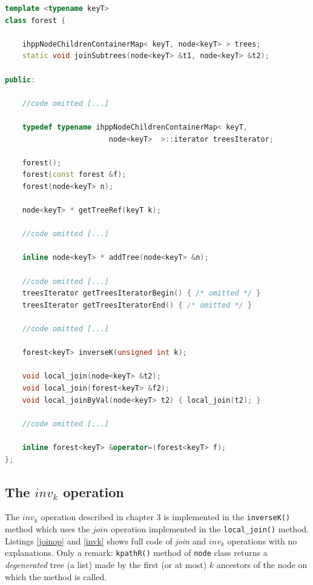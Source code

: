 \documentclass[a4paper,10pt]{report}
\begin{document}
\begin{lstlisting}[language=C++, 
	caption={partial definition of \texttt{forest<keyT>} class}, 
	label=forestClass, frame=leftline]
template <typename keyT>
class forest {

	ihppNodeChildrenContainerMap< keyT, node<keyT> > trees;
	static void joinSubtrees(node<keyT> &t1, node<keyT> &t2);

public:

	//code omitted [...]
	
	typedef typename ihppNodeChildrenContainerMap< keyT, 
						node<keyT>  >::iterator treesIterator;

	forest();
	forest(const forest &f);
	forest(node<keyT> n);

	node<keyT> * getTreeRef(keyT k);
	
	//code omitted [...]

	inline node<keyT> * addTree(node<keyT> &n);
	
	//code omitted [...]
	treesIterator getTreesIteratorBegin() { /* omitted */ }
	treesIterator getTreesIteratorEnd() { /* omitted */ }
	
	//code omitted [...]

	forest<keyT> inverseK(unsigned int k);

	void local_join(node<keyT> &t2);
	void local_join(forest<keyT> &f2);
	void local_joinByVal(node<keyT> t2) { local_join(t2); }
	
	//code omitted [...]

	inline forest<keyT> &operator=(forest<keyT> f);
};

\end{lstlisting}

\subsection{The $inv_k$ operation}

The $inv_k$ operation described in chapter 3 is implemented
in the \verb|inverseK()| method which uses the $join$ operation implemented in 
the \verb|local_join()| method. Listings \ref{joinop} and \ref{invk}
shows full code of \emph{join} and $inv_k$ operations with no  
explanations. Only a remark: \verb|kpathR()| method of \verb|node| class
returns a \emph{degenerated} tree (a list) made by the first (or at most) $k$ 
ancestors of the node on which the method is called.
\end{document}
